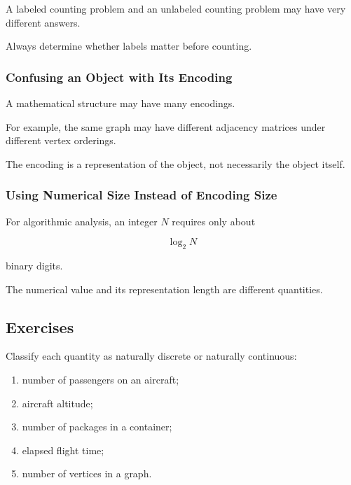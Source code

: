 A labeled counting problem and an unlabeled counting problem may have
very different answers.

Always determine whether labels matter before counting.

\subsubsection{Confusing an Object with Its Encoding}

A mathematical structure may have many encodings.

For example, the same graph may have different adjacency matrices under
different vertex orderings.

The encoding is a representation of the object, not necessarily the
object itself.

\subsubsection{Using Numerical Size Instead of Encoding Size}

For algorithmic analysis, an integer \(N\) requires only about

\[
\log_2 N
\]

binary digits.

The numerical value and its representation length are different
quantities.

\subsection{Exercises}
\label{subsec:discrete-structures-exercises}

\begin{exercise}[1]
Classify each quantity as naturally discrete or naturally continuous:

\begin{enumerate}
    \item number of passengers on an aircraft;
    \item aircraft altitude;
    \item number of packages in a container;
    \item elapsed flight time;
    \item number of vertices in a graph.
\end{enumerate}
\end{exercise}

